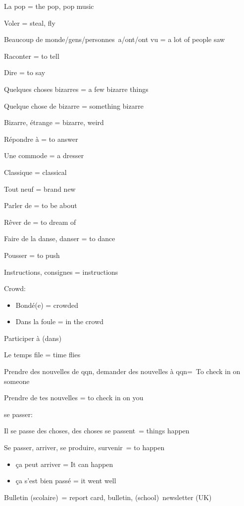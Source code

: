 {La pop = the pop, pop music~}

{Voler = steal, fly}

{Beaucoup de monde/gens/personnes~a/ont/ont vu = a lot of people saw}

{Raconter = to tell}

{Dire = to say}

{Quelques choses bizarres = a few bizarre things~}

{Quelque chose de bizarre = something bizarre~}

{Bizarre, étrange = bizarre, weird~}

{Répondre à = to answer~}

{Une commode = a dresser~}

{Classique = classical~}

{Tout neuf = brand new~}

{Parler de = to be about~}

{Rêver de = to dream of~}

{Faire de la danse, danser = to dance}

{Pousser = to push~}

{Instructions, consignes = instructions~}

{Crowd:}

\begin{itemize}
\item
  {Bondé(e) = crowded~}
\item
  {Dans la foule = in the crowd~}
\end{itemize}

{Participer à} {(dans)}

{Le temps file = time flies~}

{Prendre des nouvelles de qqn, demander des nouvelles à qqn=~To check in
on someone~}

{Prendre de tes nouvelles = to check in on you~}

{se passer:}

{Il se passe des choses, des choses se passent~= things happen~}

{Se passer, arriver, se produire, survenir~= to happen~}

\begin{itemize}
\item
  {ça peut arriver = It can happen}
\item
  {ça s'est bien passé = it went well}
\end{itemize}

{Bulletin (scolaire)~= report card, bulletin, (school)~newsletter (UK)}

